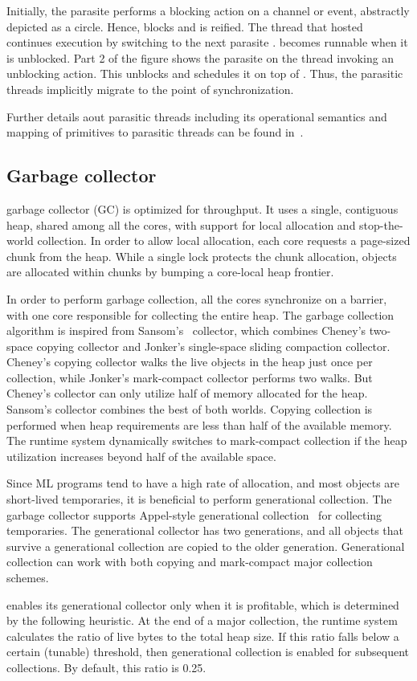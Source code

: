 Initially, the parasite  performs a blocking action on a channel or
event, abstractly depicted as a circle. Hence,  blocks and is
reified. The thread  that hosted  continues execution by
switching to the next parasite .  becomes runnable when it
is unblocked. Part 2 of the figure shows the parasite  on the thread
 invoking an unblocking action. This unblocks  and
schedules it on top of . Thus, the parasitic threads implicitly
migrate to the point of synchronization.

Further details aout parasitic threads including its operational semantics and
mapping of \acml primitives to parasitic threads can be found in~\cite{JFP14}.

\subsection{Garbage collector}

\MM garbage collector (GC) is optimized for throughput. It uses a single,
contiguous heap, shared among all the cores, with support for local allocation
and stop-the-world collection. In order to allow local allocation, each core
requests a page-sized chunk from the heap. While a single lock protects the
chunk allocation, objects are allocated within chunks by bumping a core-local
heap frontier.

In order to perform garbage collection, all the cores synchronize on a barrier,
with one core responsible for collecting the entire heap. The garbage
collection algorithm is inspired from Sansom's~\cite{Sansom91} collector, which
combines Cheney's two-space copying collector and Jonker's single-space sliding
compaction collector. Cheney's copying collector walks the live objects in the
heap just once per collection, while Jonker's mark-compact collector performs
two walks. But Cheney's collector can only utilize half of memory allocated for
the heap. Sansom's collector combines the best of both worlds. Copying
collection is performed when heap requirements are less than half of the
available memory. The runtime system dynamically switches to mark-compact
collection if the heap utilization increases beyond half of the available
space.

Since ML programs tend to have a high rate of allocation, and most objects are
short-lived temporaries, it is beneficial to perform generational collection.
The garbage collector supports Appel-style generational
collection~\cite{Appel89} for collecting temporaries. The generational
collector has two generations, and all objects that survive a generational
collection are copied to the older generation. Generational collection can work
with both copying and mark-compact major collection schemes.

\MM enables its generational collector only when it is profitable, which is
determined by the following heuristic. At the end of a major collection, the
runtime system calculates the ratio of live bytes to the total heap size. If
this ratio falls below a certain (tunable) threshold, then generational
collection is enabled for subsequent collections. By default, this ratio is
0.25.
